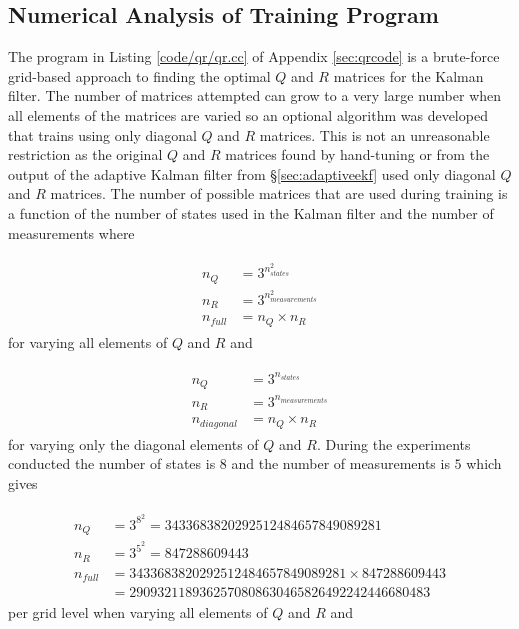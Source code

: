 
\subsection{Numerical Analysis of Training Program}
\label{sec:trainingNumericalAnalysis}
The program in Listing \ref{code/qr/qr.cc} of Appendix \ref{sec:qrcode} is a brute-force grid-based approach to finding the optimal $Q$ and $R$ matrices for the Kalman filter. The number of matrices attempted can grow to a very large number when all elements of the matrices are varied so an optional algorithm was developed that trains using only diagonal $Q$ and $R$ matrices. This is not an unreasonable restriction as the original $Q$ and $R$ matrices found by hand-tuning or from the output of the adaptive Kalman filter from \S\ref{sec:adaptiveekf} used only diagonal $Q$ and $R$ matrices. The number of possible matrices that are used during training is a function of the number of states used in the Kalman filter and the number of measurements where

\begin{align}
\label{eq:trainingFullMatrices}
\begin{split}
n_Q &= 3^{n_{states}^2} \\
n_R &= 3^{n_{measurements}^2} \\
n_{full} &= n_Q \times n_R
\end{split}
\end{align}
for varying all elements of $Q$ and $R$ and

\begin{align}
\label{eq:trainingDiagonalMatrices}
\begin{split}
n_Q &= 3^{n_{states}} \\
n_R &= 3^{n_{measurements}} \\
n_{diagonal} &= n_Q \times n_R
\end{split}
\end{align}
for varying only the diagonal elements of $Q$ and $R$. During the experiments conducted the number of states is $8$ and the number of measurements is $5$ which gives

\begin{align*}
\begin{split}
n_Q &= 3^{8^2} = 3433683820292512484657849089281 \\
n_R &= 3^{5^2} = 847288609443 \\
n_{full} &= 3433683820292512484657849089281 \times 847288609443 \\
&= 2909321189362570808630465826492242446680483
\end{split}
\end{align*}
per grid level when varying all elements of $Q$ and $R$ and

